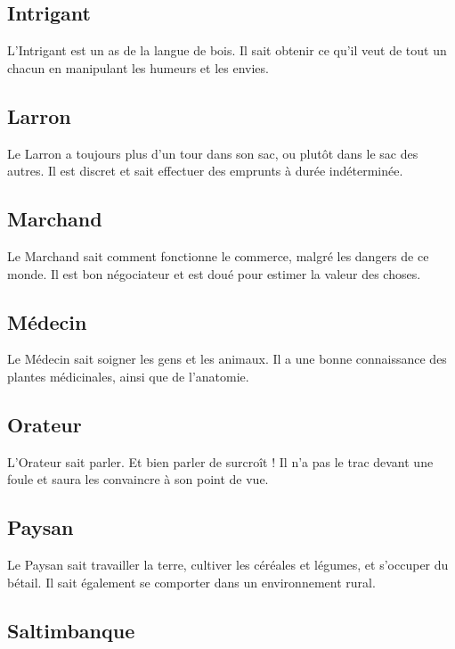 \subsection*{Intrigant}

L'Intrigant est un as de la langue de bois. Il sait obtenir ce qu'il veut de tout un chacun en manipulant les humeurs et les envies.

\subsection*{Larron}

Le Larron a toujours plus d'un tour dans son sac, ou plutôt dans le sac des autres. Il est discret et sait effectuer des emprunts à durée indéterminée.

\subsection*{Marchand}

Le Marchand sait comment fonctionne le commerce, malgré les dangers de ce monde. Il est bon négociateur et est doué pour estimer la valeur des choses.

\subsection*{Médecin}

Le Médecin sait soigner les gens et les animaux. Il a une bonne connaissance des plantes médicinales, ainsi que de l'anatomie.

\subsection*{Orateur}

L'Orateur sait parler. Et bien parler de surcroît ! Il n'a pas le trac devant une foule et saura les convaincre à son point de vue.

\subsection*{Paysan}

Le Paysan sait travailler la terre, cultiver les céréales et légumes, et s'occuper du bétail. Il sait également se comporter dans un environnement rural.

\subsection*{Saltimbanque}

